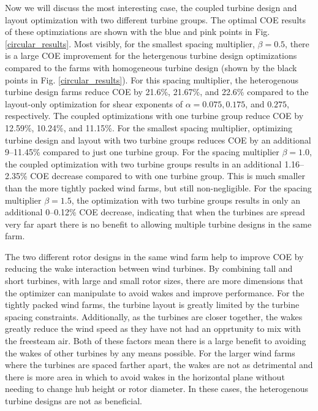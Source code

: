 Now we will discuss the most interesting case, the coupled turbine design and layout optimization with two different turbine groups. The optimal COE results of these optimziations are shown with the blue and pink points in Fig. \ref{circular_results}. Most visibly, for the smallest spacing multiplier, $\beta=0.5$, there is a large COE improvement for the hetergenous turbine design optimizations compared to the farms with homogeneous turbine design (shown by the black points in Fig. \ref{circular_results}). For this spacing multiplier, the heterogenous turbine design farms reduce COE by 21.6\%, 21.67\%, and 22.6\% compared to the layout-only optimization for shear exponents of $\alpha=0.075,0.175$, and $0.275$, respectively. The coupled optimizations with one turbine group reduce COE by 12.59\%, 10.24\%, and 11.15\%. For the smallest spacing multiplier, optimizing turbine design and layout with two turbine groups reduces COE by an additional 9--11.45\% compared to just one turbine group. For the spacing multiplier $\beta=1.0$, the coupled optimization with two turbine groups results in an additional 1.16--2.35\% COE decrease compared to with one turbine group. This is much smaller than the more tightly packed wind farms, but still non-negligible. For the spacing multiplier $\beta=1.5$, the optimization with two turbine groups results in only an additional 0--0.12\% COE decrease, indicating that when the turbines are spread very far apart there is no benefit to allowing multiple turbine designs in the same farm.

The two different rotor designs in the same wind farm help to improve COE by reducing the wake interaction between wind turbines. By combining tall and short turbines, with large and small rotor sizes, there are more dimensions that the optimizer can manipulate to avoid wakes and improve performance. For the tightly packed wind farms, the turbine layout is greatly limited by the turbine spacing constraints. Additionally, as the turbines are closer together, the wakes greatly reduce the wind speed as they have not had an opprtunity to mix with the freesteam air. Both of these factors mean there is a large benefit to avoiding the wakes of other turbines by any means possible. For the larger wind farms where the turbines are spaced farther apart, the wakes are not as detrimental and there is more area in which to avoid wakes in the horizontal plane without needing to change hub height or rotor diameter. In these cases, the heterogenous turbine designs are not as beneficial.


